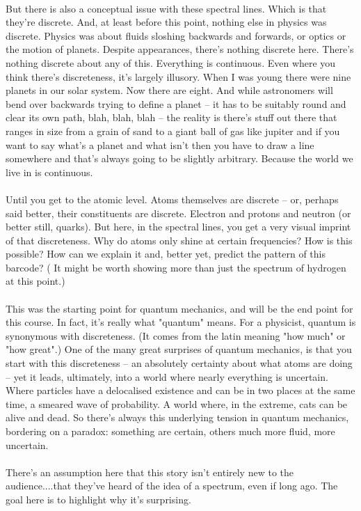 \documentclass[12pt]{article}
\newcommand\para{\paragraph{}}
\begin{document}
\para
But there is also a conceptual issue with these spectral lines. Which is that they're discrete. And, at least before this point, nothing else in physics was discrete. Physics was about fluids sloshing backwards and forwards, or optics or the motion of planets. Despite appearances, there's nothing discrete here. There's nothing discrete about any of this. Everything is continuous. Even where you think there's discreteness, it's largely illusory. When I was young there were nine planets in our solar system. Now there are eight. And while astronomers will bend over backwards trying to define a planet -- it has to be suitably round and clear its own path, blah, blah, blah -- the reality is there's stuff out there that ranges in size from a grain of sand to a giant ball of gas like jupiter and if you want to say what's a planet and what isn't then you have to draw a line somewhere and that's always going to be slightly arbitrary.  Because the world we live in is continuous.

\para
Until you get to the atomic level. Atoms themselves are discrete -- or, perhaps said better, their constituents are discrete. Electron and protons and neutron (or better still, quarks). But here, in the spectral lines, you get a very visual imprint of that discreteness. Why do atoms only shine at certain frequencies? How is this possible? How can we explain it and, better yet, predict the pattern of this barcode? ({\color{blue} It might be worth showing more than just the spectrum of hydrogen at this point.})

\para
This was the starting point for quantum mechanics, and will be the end point for this course. In fact, it's really what "quantum" means. For a physicist, quantum is synonymous with discreteness. (It comes from the latin meaning "how much" or "how great".)  One of the many great surprises of quantum mechanics, is that you start with this discreteness -- an absolutely certainty about what atoms are doing -- yet it leads, ultimately, into a world where nearly everything is uncertain. Where particles have a delocalised existence and can be in two places at the same time, a smeared wave of probability. A world where, in the extreme, cats can be alive and dead. So there's always this underlying tension in quantum mechanics, bordering on a paradox: something are certain, others much more fluid, more uncertain. 


\para
{\color{blue}There's an assumption here that this story isn't entirely new to the audience....that they've heard of the idea of a spectrum, even if long ago. The goal here is to highlight why it's surprising.}
\end{document}
